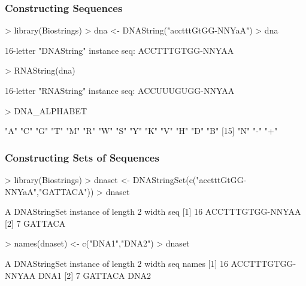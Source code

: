 \documentclass[pdf]{beamer}
\begin{document}
\begin{frame}[fragile]
 \frametitle{Constructing Sequences}
 \begin{block}{}
 \begin{footnotesize}
\begin{Schunk}
\begin{Sinput}
>  library(Biostrings)
>  dna <- DNAString("acctttGtGG-NNYaA")
>  dna
\end{Sinput}
\begin{Soutput}
  16-letter "DNAString" instance
seq: ACCTTTGTGG-NNYAA
\end{Soutput}
\begin{Sinput}
>  RNAString(dna)
\end{Sinput}
\begin{Soutput}
  16-letter "RNAString" instance
seq: ACCUUUGUGG-NNYAA
\end{Soutput}
\begin{Sinput}
>  DNA_ALPHABET
\end{Sinput}
\begin{Soutput}
 [1] "A" "C" "G" "T" "M" "R" "W" "S" "Y" "K" "V" "H" "D" "B"
[15] "N" "-" "+"
\end{Soutput}
\end{Schunk}
 \end{footnotesize}
 \end{block}
\end{frame}

\begin{frame}[fragile]
 \frametitle{Constructing Sets of Sequences}
 \begin{block}{}
 \begin{footnotesize}
\begin{Schunk}
\begin{Sinput}
>  library(Biostrings)
>  dnaset <- DNAStringSet(c("acctttGtGG-NNYaA","GATTACA"))
>  dnaset
\end{Sinput}
\begin{Soutput}
  A DNAStringSet instance of length 2
    width seq
[1]    16 ACCTTTGTGG-NNYAA
[2]     7 GATTACA
\end{Soutput}
\begin{Sinput}
>  names(dnaset) <- c("DNA1","DNA2")  
>  dnaset
\end{Sinput}
\begin{Soutput}
  A DNAStringSet instance of length 2
    width seq                           names               
[1]    16 ACCTTTGTGG-NNYAA              DNA1
[2]     7 GATTACA                       DNA2
\end{Soutput}
\end{Schunk}
 \end{footnotesize}
 \end{block}
\end{frame}
\end{document}

